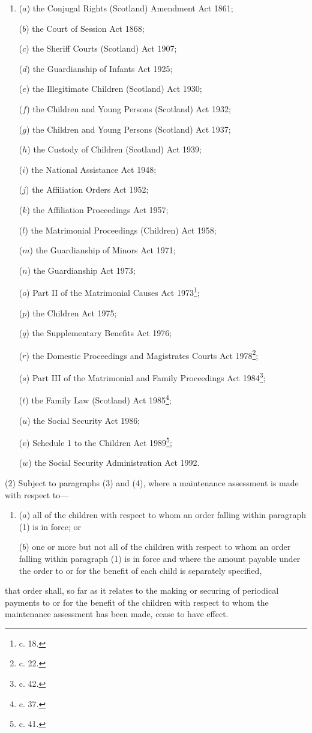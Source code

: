 \documentclass[a4paper]{article}
\begin{document}
\begin{enumerate}\item[]
($a$) the Conjugal Rights (Scotland) Amendment Act 1861;

($b$) the Court of Session Act 1868;

($c$) the Sheriff Courts (Scotland) Act 1907;

($d$) the Guardianship of Infants Act 1925;

($e$) the Illegitimate Children (Scotland) Act 1930;

($f$) the Children and Young Persons (Scotland) Act 1932;

($g$) the Children and Young Persons (Scotland) Act 1937;

($h$) the Custody of Children (Scotland) Act 1939;

($i$) the National Assistance Act 1948;

($j$) the Affiliation Orders Act 1952;

($k$) the Affiliation Proceedings Act 1957;

($l$) the Matrimonial Proceedings (Children) Act 1958;

($m$) the Guardianship of Minors Act 1971;

($n$) the Guardianship Act 1973;

($o$) Part II of the Matrimonial Causes Act 1973\footnote{ c. 18.};

($p$) the Children Act 1975;

($q$) the Supplementary Benefits Act 1976;

\begin{sloppypar}
($r$) the Domestic Proceedings and Magistrates Courts Act 1978\footnote{ c. 22.};
\end{sloppypar}

($s$) Part III of the Matrimonial and Family Proceedings Act 1984\footnote{ c. 42.};

($t$) the Family Law (Scotland) Act 1985\footnote{ c. 37.};

($u$) the Social Security Act 1986;

($v$) Schedule 1 to the Children Act 1989\footnote{ c. 41.};

($w$) the Social Security Administration Act 1992.
\end{enumerate}

(2) Subject to paragraphs (3) and (4), where a maintenance assessment is made with respect to—
\begin{enumerate}\item[]
($a$) all of the children with respect to whom an order falling within paragraph (1) is in force; or

($b$) one or more but not all of the children with respect to whom an order falling within paragraph (1) is in force and where the amount payable under the order to or for the benefit of each child is separately specified,
\end{enumerate}
that order shall, so far as it relates to the making or securing of periodical payments to or for the benefit of the children with respect to whom the maintenance assessment has been made, cease to have effect.
\end{document}
